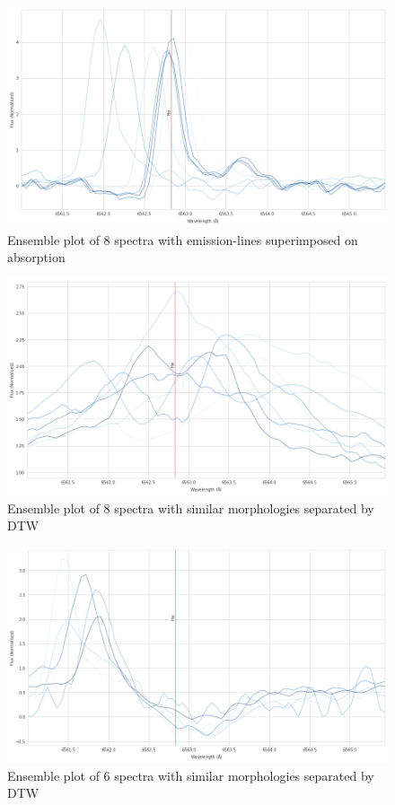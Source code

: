 \begin{figure}[!htb]
\centering
\includegraphics[scale=0.42]{figures/class_23_45.png}
\caption{Ensemble plot of 8 spectra with emission-lines superimposed on absorption}
\end{figure}

\begin{figure}[!htb]
\centering
\includegraphics[scale=0.42]{figures/class_21_45.png}
\caption{Ensemble plot of 8 spectra with similar morphologies separated by DTW}
\end{figure}

\begin{figure}[!htb]
\centering
\includegraphics[scale=0.42]{figures/class_25_45.png}
\caption{Ensemble plot of 6 spectra with similar morphologies separated by DTW}
\end{figure}

